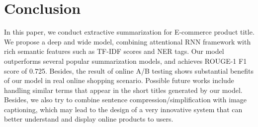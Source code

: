 \section{Conclusion}

In this paper, we conduct
extractive summarization for E-commerce product title.
We propose a deep and wide model, combining attentional RNN
framework with rich semantic features such as TF-IDF scores and NER tags.
Our model outperforms several popular summarization models,
and achieves ROUGE-1 F1 score of 0.725.
Besides, the result of online A/B testing shows substantial benefits
of our model in real online shopping scenario.
Possible future works include handling similar terms
that appear in the short titles generated by our model.
Besides, we also try to
combine sentence compression/simplification with image captioning, which may lead to the design of a very innovative system that can better understand and display online products to users.